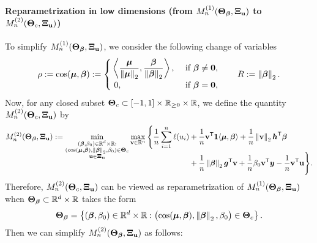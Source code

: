 \paragraph{Reparametrization in low dimensions (from $M_n^{(1)}(\bTheta_{\vbeta}, \bXi_{\bu})$ to $M_n^{(2)}(\bTheta_{c}, \bXi_{\bu})$)}
To simplify $M^{(1)}_n(\bTheta_{\vbeta}, \bXi_{\bu})$, we consider the following change of variables
\begin{equation}\label{eq:change_of_var}
    \rho := \cos(\vmu, \vbeta) := 
    \begin{cases} 
    \, \displaystyle
    \left\< \frac{\vmu}{\norm{\vmu}_2}, \frac{\vbeta}{\norm{\vbeta}_2} \right\>, 
                  & \ \text{if} \ \vbeta \not= \bzero, \\
    \  0,         & \ \text{if} \ \vbeta = \bzero, 
    \end{cases}
    \qquad
    R := \norm{\vbeta}_2.
\end{equation}
Now, for any closed subset $\bTheta_{c} \subset [-1, 1] \times \R_{\ge 0} \times \R$, we define the quantity $M_n^{(2)}(\bTheta_{c}, \bXi_{\bu})$ by 
\begin{equation*}
    \begin{aligned}
        M_n^{(2)}(\bTheta_{\vbeta}, \bXi_{\bu})
        : = \smash{ \min_{ \substack{ (\bbeta , \beta_0) \in \R^d \times \R: 
        \\ (\cos(\vmu, \vbeta), \norm{\vbeta}_2, \beta_0) \in \bTheta_{c} \\  \bu \in \bXi_{\bu} } }
        }
        \max_{ \bv \in \R^n }
        \, \Biggl\{
        \frac1n \sum_{i=1}^n \ell( u_i )
         & + \frac1n \bv^\top \bone \< \bmu, \vbeta \>
         + \frac1n \norm{\bv}_2 \hh^\top \vbeta  
         \\
         & + \frac1n \norm{\vbeta}_2 \vg^\top \bv + \frac1n \beta_0 \bv^\top \yy - \frac1n \bv^\top \bu
         \Biggr\}.
    \end{aligned}
\end{equation*}
Therefore, $M_n^{(2)}(\bTheta_{c}, \bXi_{\bu})$ can be viewed as reparametrization of $M_n^{(1)}(\bTheta_{\vbeta}, \bXi_{\bu})$ when $\bTheta_{\vbeta} \subset \R^{d} \times \R$ takes the form
\begin{equation*}
        \bTheta_{\vbeta} = \left\{ 
        (\vbeta, \beta_0) \in \R^{d} \times \R:
        \bigl( \cos(\vmu, \vbeta), \norm{\vbeta}_2, \beta_0 \bigr) \in \bTheta_{c}
        \right\}.
\end{equation*}
Then we can simplify $M_n^{(2)}(\bTheta_{\vbeta}, \bXi_{\bu})$ as follows:
